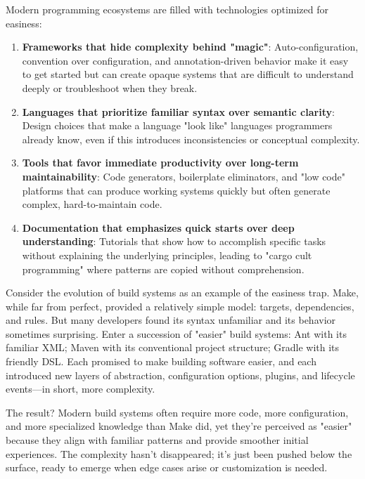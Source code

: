 \documentclass[11pt]{article}
\begin{document}
Modern programming ecosystems are filled with technologies optimized for easiness:

\begin{enumerate}
\item \textbf{Frameworks that hide complexity behind "magic"}: Auto-configuration, convention over configuration, and annotation-driven behavior make it easy to get started but can create opaque systems that are difficult to understand deeply or troubleshoot when they break.

\item \textbf{Languages that prioritize familiar syntax over semantic clarity}: Design choices that make a language "look like" languages programmers already know, even if this introduces inconsistencies or conceptual complexity.

\item \textbf{Tools that favor immediate productivity over long-term maintainability}: Code generators, boilerplate eliminators, and "low code" platforms that can produce working systems quickly but often generate complex, hard-to-maintain code.

\item \textbf{Documentation that emphasizes quick starts over deep understanding}: Tutorials that show how to accomplish specific tasks without explaining the underlying principles, leading to "cargo cult programming" where patterns are copied without comprehension.
\end{enumerate}

Consider the evolution of build systems as an example of the easiness trap. Make, while far from perfect, provided a relatively simple model: targets, dependencies, and rules. But many developers found its syntax unfamiliar and its behavior sometimes surprising. Enter a succession of "easier" build systems: Ant with its familiar XML; Maven with its conventional project structure; Gradle with its friendly DSL. Each promised to make building software easier, and each introduced new layers of abstraction, configuration options, plugins, and lifecycle events—in short, more complexity.

The result? Modern build systems often require more code, more configuration, and more specialized knowledge than Make did, yet they're perceived as "easier" because they align with familiar patterns and provide smoother initial experiences. The complexity hasn't disappeared; it's just been pushed below the surface, ready to emerge when edge cases arise or customization is needed.
\end{document}
